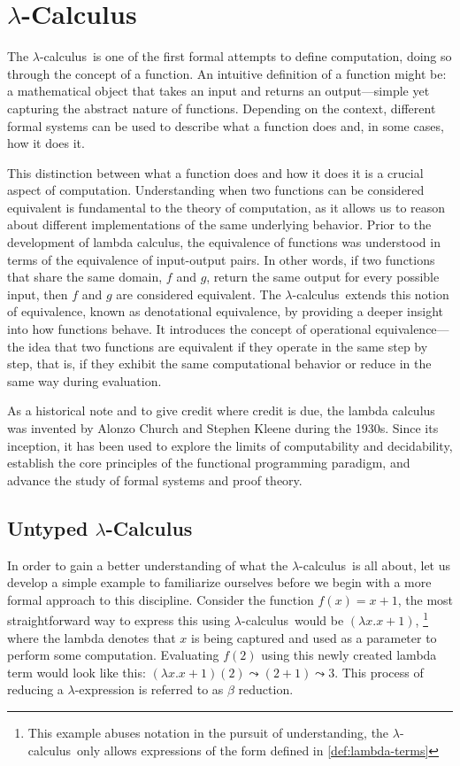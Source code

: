 \documentclass[12pt]{book}
\newcommand{\lCalc}{$\lambda$-Calculus}
\newcommand{\lcalc}{$\lambda$-calculus}
\newcommand{\la}{$\lambda$}
\newcommand{\curly}{\mathrel{\leadsto}}
\theoremstyle{plain}
\theoremstyle{definition}
\theoremstyle{definition}
\theoremstyle{remark}
\begin{document}
\chapter{\lCalc}

The \lcalc \ is one of the first formal attempts to define computation, doing so through the concept of a function. An intuitive definition of a function might be: a mathematical object that takes an input and returns an output—simple yet capturing the abstract nature of functions. Depending on the context, different formal systems can be used to describe what a function does and, in some cases, how it does it.

This distinction between what a function does and how it does it is a crucial aspect of computation. Understanding when two functions can be considered equivalent is fundamental to the theory of computation, as it allows us to reason about different implementations of the same underlying behavior. Prior to the development of lambda calculus, the equivalence of functions was understood in terms of the equivalence of input-output pairs. In other words, if two functions that share the same domain, $f$ and $g$, return the same output for every possible input, then $f$ and $g$ are considered equivalent. The \lcalc \ extends this notion of equivalence, known as denotational equivalence, by providing a deeper insight into how functions behave. It introduces the concept of operational equivalence—the idea that two functions are equivalent if they operate in the same step by step, that is, if they exhibit the same computational behavior or reduce in the same way during evaluation.

As a historical note and to give credit where credit is due, the lambda calculus was invented by Alonzo Church and Stephen Kleene during the 1930s. Since its inception, it has been used to explore the limits of computability and decidability, establish the core principles of the functional programming paradigm, and advance the study of formal systems and proof theory.

\section*{\centering Untyped \lCalc}

In order to gain a better understanding of what the \lcalc \ is all about, let us develop a simple example to familiarize ourselves before we begin with a more formal approach to this discipline. Consider the function $f(x) = x + 1$, the most straightforward way to express this using \lcalc \ would be $(\lambda x . x + 1 )$, \footnote{ This example abuses notation in the pursuit of understanding, the \lcalc \ only allows expressions of the form defined in \ref{def:lambda-terms} } where the lambda denotes that $x$ is being captured and used as a parameter to perform some computation. Evaluating $f(2)$ using this newly created lambda term would look like this: $(\lambda x . x + 1)(2) \curly (2 + 1) \curly 3$. This process of reducing a \la-expression is referred to as $\beta$ reduction.\\
\end{document}
